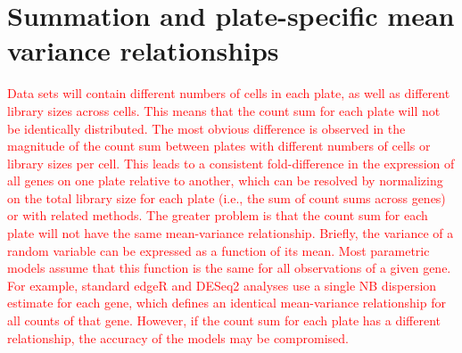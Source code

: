 \documentclass{article}
\newcommand\revised[1]{\textcolor{red}{#1}}
\begin{document}
\section{Summation and plate-specific mean variance relationships}
\revised{Data sets will contain different numbers of cells in each plate, as well as different library sizes across cells.
This means that the count sum for each plate will not be identically distributed.
The most obvious difference is observed in the magnitude of the count sum between plates with different numbers of cells or library sizes per cell.
This leads to a consistent fold-difference in the expression of all genes on one plate relative to another, which can be resolved by normalizing on the total library size for each plate (i.e., the sum of count sums across genes) or with related methods.
The greater problem is that the count sum for each plate will not have the same mean-variance relationship.
Briefly, the variance of a random variable can be expressed as a function of its mean.
Most parametric models assume that this function is the same for all observations of a given gene.
For example, standard edgeR and DESeq2 analyses use a single NB dispersion estimate for each gene, which defines an identical mean-variance relationship for all counts of that gene.
However, if the count sum for each plate has a different relationship, the accuracy of the models may be compromised.}
\end{document}
